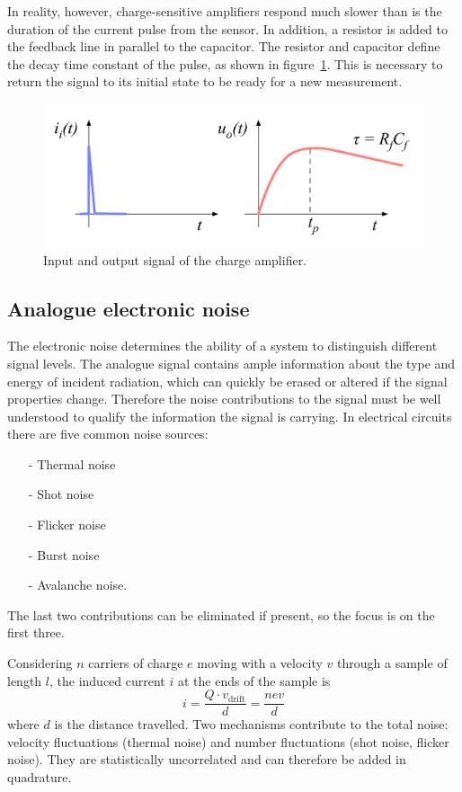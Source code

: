 In reality, however, charge-sensitive amplifiers respond much slower than is the duration of the current pulse from the sensor. In addition, a resistor is added to the feedback line in parallel to the capacitor. The resistor and capacitor define the decay time constant of the pulse, as shown in figure~\ref{fig:chgrc}. This is necessary to return the signal to its initial state to be ready for a new measurement.
\begin{figure}[!t]
\begin{center}
\includegraphics[width=0.7\linewidth]{02_pulse_formation/pics/plots/chgrc}
\caption{Input and output signal of the charge amplifier.}
\label{fig:chgrc}
\end{center}
\end{figure}

\subsection{Analogue electronic noise}
The electronic noise determines the ability of a system to distinguish different signal levels. The analogue signal contains ample information about the type and energy of incident radiation, which can quickly be erased or altered if the signal properties change. Therefore the noise contributions to the signal must be well understood to qualify the information the signal is carrying. In electrical circuits there are five common noise sources:
\begin{itemize}
\item[-]Thermal noise
\item[-]Shot noise
\item[-]Flicker noise
\item[-]Burst noise
\item[-]Avalanche noise.
\end{itemize}
The last two contributions can be eliminated if present, so the focus is on the first three.

Considering $n$ carriers of charge $e$ moving with a velocity $v$ through a sample of length $l$, the induced current $i$ at the ends of the sample is
\begin{equation}
i = \frac {Q \cdot v_\mathrm{drift}} {d}  = \frac {n e v } {d}
\end{equation}
where $d$ is the distance travelled. Two mechanisms contribute to the total noise: velocity fluctuations (thermal noise) and number fluctuations (shot noise, flicker noise). They are statistically uncorrelated and can therefore be added in quadrature.

